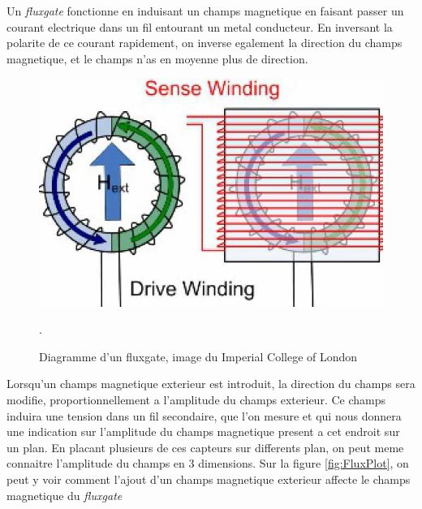 \documentclass[a4paper, 12pt, titlepage, oneside, french]{article}
\begin{document}
	Un \textit{fluxgate} fonctionne en induisant un champs magnetique en faisant passer un courant electrique dans un fil entourant un metal conducteur. En inversant la polarite de ce courant rapidement, on inverse egalement la direction du champs magnetique, et le champs n'as en moyenne plus de direction.
	\begin{figure}[H]
		\centering
		\includegraphics[width=\textwidth, height=0.9\textheight, keepaspectratio]{FluxgateDiagram.jpg}
		\caption{Diagramme d'un fluxgate, image du Imperial College of London}. 
		\label{fig:FluxDiag}
	\end{figure}
	Lorsqu'un champs magnetique exterieur est introduit, la direction du champs sera modifie, proportionnellement a l'amplitude du champs exterieur. Ce champs induira une tension dans un fil secondaire, que l'on mesure et qui nous donnera une indication sur l'amplitude du champs magnetique present a cet endroit sur un plan. En placant plusieurs de ces capteurs sur differents plan, on peut meme connaitre l'amplitude du champs en 3 dimensions. Sur la figure \ref{fig:FluxPlot}, on peut y voir comment l'ajout d'un champs magnetique exterieur affecte le champs magnetique du \textit{fluxgate}
\end{document}
